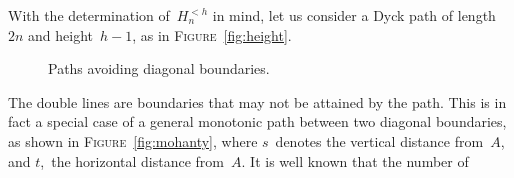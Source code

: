 \documentclass[11pt]{article}
\newcommand\fig{\textsc{Figure}}
\newcommand{\A}[2]{H_{#1}^{<#2}}
\begin{document}
With the determination of~\(\A{n}{h}\) in mind, let us consider a Dyck
path of length \(2n\) and height~\(h-1\), as in \fig~\ref{fig:height}.
\begin{figure}
\centering
{}
\qquad
{}
\caption{Paths avoiding diagonal boundaries.\label{fig:boundaries}}
\end{figure}
The double lines are boundaries that may not be attained by the
path. This is in fact a special case of a general monotonic path
between two diagonal boundaries, as shown in \fig~\ref{fig:mohanty},
where \(s\)~denotes the vertical distance from~\(A\), and \(t\),~the
horizontal distance from~\(A\). It is well known that the number of
\end{document}

